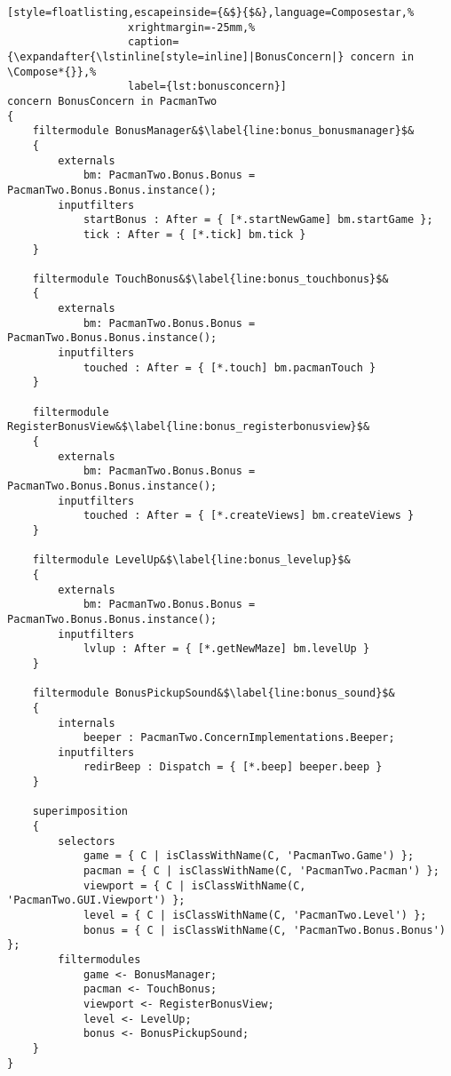 \begin{lstlisting}[style=floatlisting,escapeinside={&$}{$&},language=Composestar,%
                   xrightmargin=-25mm,%
                   caption={\expandafter{\lstinline[style=inline]|BonusConcern|} concern in \Compose*{}},%
                   label={lst:bonusconcern}]
concern BonusConcern in PacmanTwo
{
	filtermodule BonusManager&$\label{line:bonus_bonusmanager}$&
	{
		externals
			bm: PacmanTwo.Bonus.Bonus = PacmanTwo.Bonus.Bonus.instance();
		inputfilters
			startBonus : After = { [*.startNewGame] bm.startGame };
			tick : After = { [*.tick] bm.tick }
	}

	filtermodule TouchBonus&$\label{line:bonus_touchbonus}$&
	{
		externals
			bm: PacmanTwo.Bonus.Bonus = PacmanTwo.Bonus.Bonus.instance();
		inputfilters
			touched : After = { [*.touch] bm.pacmanTouch }
	}

	filtermodule RegisterBonusView&$\label{line:bonus_registerbonusview}$&
	{
		externals
			bm: PacmanTwo.Bonus.Bonus = PacmanTwo.Bonus.Bonus.instance();
		inputfilters
			touched : After = { [*.createViews] bm.createViews }
	}

	filtermodule LevelUp&$\label{line:bonus_levelup}$&
	{
		externals
			bm: PacmanTwo.Bonus.Bonus = PacmanTwo.Bonus.Bonus.instance();
		inputfilters
			lvlup : After = { [*.getNewMaze] bm.levelUp }
	}

	filtermodule BonusPickupSound&$\label{line:bonus_sound}$&
	{
		internals
			beeper : PacmanTwo.ConcernImplementations.Beeper;
		inputfilters
			redirBeep : Dispatch = { [*.beep] beeper.beep }
	}

	superimposition
	{
		selectors
			game = { C | isClassWithName(C, 'PacmanTwo.Game') };
			pacman = { C | isClassWithName(C, 'PacmanTwo.Pacman') };
			viewport = { C | isClassWithName(C, 'PacmanTwo.GUI.Viewport') };
			level = { C | isClassWithName(C, 'PacmanTwo.Level') };
			bonus = { C | isClassWithName(C, 'PacmanTwo.Bonus.Bonus') };
		filtermodules
			game <- BonusManager;
			pacman <- TouchBonus;
			viewport <- RegisterBonusView;
			level <- LevelUp;
			bonus <- BonusPickupSound;
	}
}
\end{lstlisting}

